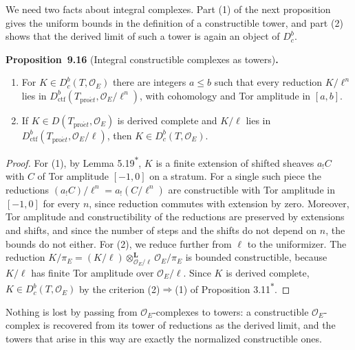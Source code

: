 \documentclass[11pt]{article}
\newenvironment{bpstatement}[2]{\par\addvspace{0.6\baselineskip}\noindent\textbf{#1}#2\textbf{.}\enspace\ignorespaces}
  {\par\addvspace{0.4\baselineskip}}
\newenvironment{bpstatementit}[2]{\begin{bpstatement}{#1}{#2}\itshape\ignorespaces}{\end{bpstatement}}
\newcommand{\bpout}[1]{#1\textsuperscript{\hyperlink{bp-outside}{\ensuremath{\ast}}}}
\providecommand{\Dbc}{}\renewcommand{\Dbc}{D^b_c}
\begin{document}
We need two facts about integral complexes. Part (1) of the next proposition gives the uniform bounds in the definition of a constructible tower, and part (2) shows that the derived limit of such a tower is again an object of \(\Dbc\).

\label{bp54}%
\begin{bpstatementit}{Proposition~9.16}{ (Integral constructible complexes as towers)}
\begin{enumerate}
\item For \(K\in\Dbc(T,\mathcal O_E)\) there are integers \(a\le b\) such that every reduction \(K/\ell^n\) lies in \(D^b_{\mathrm{ctf}}(T_{\mathrm{pro}\acute{e}t},\mathcal O_E/\ell^n)\), with cohomology and Tor amplitude in \([a,b]\).
\item If \(K\in D(T_{\mathrm{pro}\acute{e}t},\mathcal O_E)\) is derived complete and \(K/\ell\) lies in \(D^b_{\mathrm{ctf}}(T_{\mathrm{pro}\acute{e}t},\mathcal O_E/\ell)\), then \(K\in\Dbc(T,\mathcal O_E)\).
\end{enumerate}
\end{bpstatementit}

\begin{proof}[{Proof}]\label{bp55}%
For (1), by Lemma \bpout{5.19}, \(K\) is a finite extension of shifted sheaves \(a_!C\) with \(C\) of Tor amplitude \([-1,0]\) on a stratum. For a single such piece the reductions \((a_!C)/\ell^n=a_!(C/\ell^n)\) are constructible with Tor amplitude in \([-1,0]\) for every \(n\), since reduction commutes with extension by zero. Moreover, Tor amplitude and constructibility of the reductions are preserved by extensions and shifts, and since the number of steps and the shifts do not depend on \(n\), the bounds do not either. For (2), we reduce further from \(\ell\) to the uniformizer. The reduction \(K/\pi_E=(K/\ell)\otimes^{\mathbf L}_{\mathcal O_E/\ell}\mathcal O_E/\pi_E\) is bounded constructible, because \(K/\ell\) has finite Tor amplitude over \(\mathcal O_E/\ell\). Since \(K\) is derived complete, \(K\in\Dbc(T,\mathcal O_E)\) by the criterion (2)\(\Rightarrow\)(1) of Proposition \bpout{3.11}.
\end{proof}

\label{bp56}%
Nothing is lost by passing from \(\mathcal O_E\)-complexes to towers: a constructible \(\mathcal O_E\)-complex is recovered from its tower of reductions as the derived limit, and the towers that arise in this way are exactly the normalized constructible ones.
\end{document}
